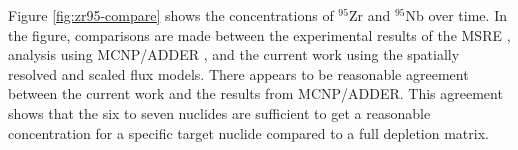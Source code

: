 \documentclass{style/nseJournal}
\begin{document}
Figure \ref{fig:zr95-compare} shows the concentrations of $^{95}$Zr and $^{95}$Nb over time.
In the figure, comparisons are made between the experimental results of the MSRE \cite{compere1975fission}, analysis using MCNP/ADDER \cite{fei_validation_2022}, and the current work using the spatially resolved and scaled flux models.
There appears to be reasonable agreement between the current work and the results from MCNP/ADDER.
This agreement shows that the six to seven nuclides are sufficient to get a reasonable concentration for a specific target nuclide compared to a full depletion matrix.








\end{document}
